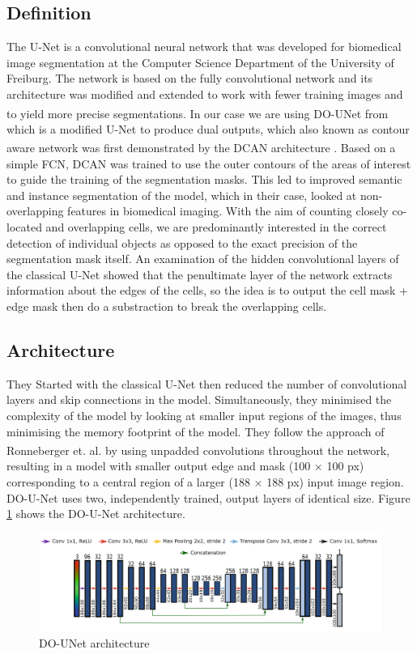 \subsection{Definition}
The U-Net is a convolutional neural network that was developed for biomedical image segmentation at the Computer Science Department of the University of Freiburg. The network is based on the fully convolutional network and its architecture was modified and extended to work with fewer training images and to yield more precise segmentations. In our case we are using DO-UNet from \textsuperscript{\cite{10.1007/978-3-030-44584-3_31}} which is a modified U-Net to produce dual outputs, which also known as contour aware network was first demonstrated by the DCAN architecture \textsuperscript{\cite{chen2016dcan}}.  Based on a simple FCN, DCAN was trained to use the outer
contours of the areas of interest to guide the training of the segmentation masks. This led to improved semantic and instance segmentation of the model, which in their case, looked at non-overlapping features in biomedical imaging.
With the aim of counting closely co-located and overlapping cells, we are predominantly interested in the correct detection of individual objects as
opposed to the exact precision of the segmentation mask itself. An examination
of the hidden convolutional layers of the classical U-Net showed that the penultimate layer of the network extracts information about the edges of the cells, so the idea is to output the cell mask + edge mask then do a substraction to break the overlapping cells.

\subsection{Architecture}
They Started with the classical U-Net then reduced the number of
convolutional layers and skip connections in the model. Simultaneously, they minimised the complexity of the model by looking at smaller input regions of the images, thus minimising the memory footprint of the model. They follow the approach of Ronneberger et. al. \textsuperscript{\cite{10.1007/978-3-030-44584-3_31}} by using unpadded convolutions throughout the network, resulting in a model with smaller output edge and mask (100 × 100 px) corresponding to a central region of a larger (188 × 188 px) input image region. DO-U-Net uses two, independently trained, output layers of identical size. Figure \ref{fig:DO-UNET} shows the DO-U-Net architecture.

\begin{figure}[H]
\centering
  \vspace{-0.1in}
    \centerline{\includegraphics[width = \linewidth]{../images/DO-UNET.png}}
    \caption{DO-UNet architecture}
    \label{fig:DO-UNET}
\end{figure}

